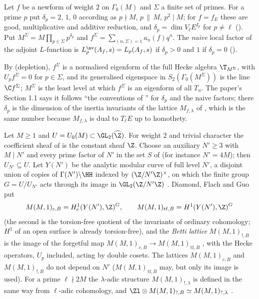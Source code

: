 \begin{definition}\label{def:congruence:depletion-recall}
Let $f$ be a newform of weight $2$ on $\Gamma_0(M)$ and $\Sigma$ a finite set of primes. For a prime $p$ put $\delta_p=2$, $1$, $0$ according as $p\nmid M$, $p\,\|\,M$, $p^2\mid M$; for $f=f_E$ these
are good, multiplicative and additive reduction, and $\delta_p=\dim V_\ell E^{I_p}$ for $p\ne\ell$ (). Put $M^\Sigma=M\prod_{p\in\Sigma}p^{\delta_p}$ and
$f^\Sigma=\sum_{(n,\Sigma)=1}a_n(f)q^n$. The \emph{naive} local factor of the adjoint $L$-function is $L^{\nv}_p(A_f,s)=L_p(A_f,s)$ if $\delta_p>0$ and $1$ if $\delta_p=0$ ().
\end{definition}

By  (depletion), $f^\Sigma$ is a normalised eigenform of the full Hecke algebra $\T_{M^\Sigma}$, with $U_pf^\Sigma=0$ for $p\in\Sigma$, and its generalised eigenspace in
$S_2(\Gamma_0(M^\Sigma))$ is the line $\C f^\Sigma$; $M^\Sigma$ is the least level at which $f^\Sigma$ is an eigenform of all $T_n$. The paper's Section 1.1 says it follows ``the conventions of
\cite[\S1.7.2]{DFG04}'' for $\delta_p$ and the naive factors; there $\delta_p$ is the dimension of the inertia invariants of the lattice $M_{f,\lambda}$ of , which is the
same number because $M_{f,\lambda}$ is dual to $T_\ell E$ up to homothety.

\begin{definition}\label{def:congruence:integral-structure}
Let $M\ge1$ and $U=U_0(M)\subset\GL_2(\widehat\Z)$. For weight $2$ and trivial character the coefficient sheaf of \cite[Section 1.2.2]{DFG04} is the constant sheaf $\Z$. Choose an
auxiliary $N'\ge3$ with $M\mid N'$ and every prime factor of $N'$ in the set $S$ of \cite[Section 1.4.1]{DFG04} (for instance $N'=4M$); then $U_{N'}\subseteq U$. Let $Y(N')$ be the analytic
modular curve of full level $N'$, a disjoint union of copies of $\Gamma(N')\backslash\HH$ indexed by $(\Z/N'\Z)^\times$, on which the finite group $G=U/U_{N'}$ acts through its image in
$\GL_2(\Z/N'\Z)$ \cite[Sections 1.2.1, 1.3.2]{DFG04}. Diamond, Flach and Guo put \cite[Section 1.4.1]{DFG04}
\[
M(M,1)_{c,B}=H^1_c(Y(N'),\Z)^G,\qquad M(M,1)_{\mathrm{tf},B}=H^1(Y(N'),\Z)^G
\]
(the second is the torsion-free quotient of the invariants of ordinary cohomology; $H^1$ of an open surface is already torsion-free), and the \emph{Betti lattice} $M(M,1)_{!,B}$ is the image of
the forgetful map $M(M,1)_{c,B}\to M(M,1)_{\mathrm{tf},B}$ \cite[Section 1.4.2]{DFG04}, with the Hecke operators, $U_p$ included, acting by double cosets. The lattices $M(M,1)_{c,B}$ and $M(M,1)_{!,B}$ do not depend on $N'$
\cite[Section 1.4.1, Lemma 1.1]{DFG04} ($M(M,1)_{\mathrm{tf},B}$ may, but only its image is used). For a prime $\ell\nmid2M$ the $\lambda$-adic structure $M(M,1)_{!,\lambda}$ is defined in the same way from $\ell$-adic cohomology, and $\Zl\otimes M(M,1)_{?,B}\simeq M(M,1)_{?,\lambda}$
\cite[Section 1.2.3]{DFG04}.
\end{definition}

